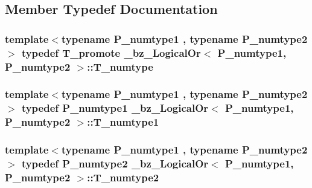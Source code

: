 \subsection{Member Typedef Documentation}
\hypertarget{class__bz__LogicalOr_a4cbb68f8e6d036bc980ef51ae4b6ea29}{}
\subsubsection[{T\+\_\+numtype}]{\setlength{\rightskip}{0pt plus 5cm}template$<$typename P\+\_\+numtype1 , typename P\+\_\+numtype2 $>$ typedef {\bf T\+\_\+promote} {\bf \+\_\+bz\+\_\+\+Logical\+Or}$<$ P\+\_\+numtype1, P\+\_\+numtype2 $>$\+::{\bf T\+\_\+numtype}}\label{class__bz__LogicalOr_a4cbb68f8e6d036bc980ef51ae4b6ea29}
\hypertarget{class__bz__LogicalOr_a1e18554e45fdc303f5848c36ba23fc3a}{}
\subsubsection[{T\+\_\+numtype1}]{\setlength{\rightskip}{0pt plus 5cm}template$<$typename P\+\_\+numtype1 , typename P\+\_\+numtype2 $>$ typedef P\+\_\+numtype1 {\bf \+\_\+bz\+\_\+\+Logical\+Or}$<$ P\+\_\+numtype1, P\+\_\+numtype2 $>$\+::{\bf T\+\_\+numtype1}}\label{class__bz__LogicalOr_a1e18554e45fdc303f5848c36ba23fc3a}
\hypertarget{class__bz__LogicalOr_a2bb4cea0a17a474125daeaa515a2777f}{}
\subsubsection[{T\+\_\+numtype2}]{\setlength{\rightskip}{0pt plus 5cm}template$<$typename P\+\_\+numtype1 , typename P\+\_\+numtype2 $>$ typedef P\+\_\+numtype2 {\bf \+\_\+bz\+\_\+\+Logical\+Or}$<$ P\+\_\+numtype1, P\+\_\+numtype2 $>$\+::{\bf T\+\_\+numtype2}}\label{class__bz__LogicalOr_a2bb4cea0a17a474125daeaa515a2777f}
\hypertarget{class__bz__LogicalOr_a00ba6e696cf25190221df937a18b6bfd}{}
